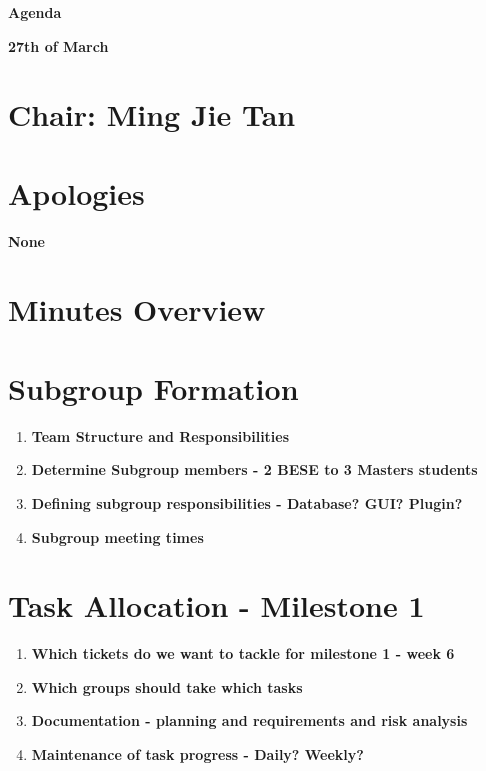 \documentclass[10pt,english, a4paper]{article}
\begin{document}
\begin{center}
\textbf{\huge Agenda}{\par}
\textbf{27th of March}
\par\end{center}{\huge \par}

\section*{{Chair: Ming Jie Tan}}

\section{{Apologies}}

\textbf{ None }{ \par}

\section{{Minutes Overview}}

\section{{Subgroup Formation}}
\begin{enumerate}
\item \textbf{Team Structure and Responsibilities}{ \par}
\item \textbf{Determine Subgroup members - 2 BESE to 3 Masters students}{ \par}
\item \textbf{Defining subgroup responsibilities - Database? GUI? Plugin?}{ \par}
\item \textbf{Subgroup meeting times}{ \par}
\end{enumerate}

\section{{Task Allocation - Milestone 1}}

\begin{enumerate}
\item \textbf{Which tickets do we want to tackle for milestone 1 - week 6 }{ \par}
\item \textbf{Which groups should take which tasks}{ \par}
\item \textbf{Documentation - planning and requirements and risk analysis}{ \par}
\item \textbf{Maintenance of task progress - Daily? Weekly?}{ \par}
\end{enumerate}
\end{document}
